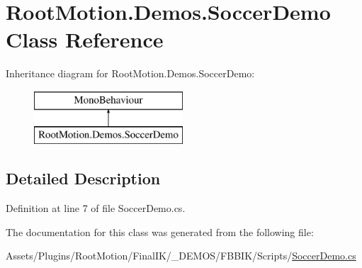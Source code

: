 \hypertarget{class_root_motion_1_1_demos_1_1_soccer_demo}{}\section{Root\+Motion.\+Demos.\+Soccer\+Demo Class Reference}
\label{class_root_motion_1_1_demos_1_1_soccer_demo}
Inheritance diagram for Root\+Motion.\+Demos.\+Soccer\+Demo\+:\begin{figure}[H]
\begin{center}
\leavevmode
\includegraphics[height=2.000000cm]{class_root_motion_1_1_demos_1_1_soccer_demo}
\end{center}
\end{figure}


\subsection{Detailed Description}


Definition at line 7 of file Soccer\+Demo.\+cs.



The documentation for this class was generated from the following file\+:\begin{DoxyCompactItemize}
\item 
Assets/\+Plugins/\+Root\+Motion/\+Final\+I\+K/\+\_\+\+D\+E\+M\+O\+S/\+F\+B\+B\+I\+K/\+Scripts/\mbox{\hyperlink{_soccer_demo_8cs}{Soccer\+Demo.\+cs}}\end{DoxyCompactItemize}
